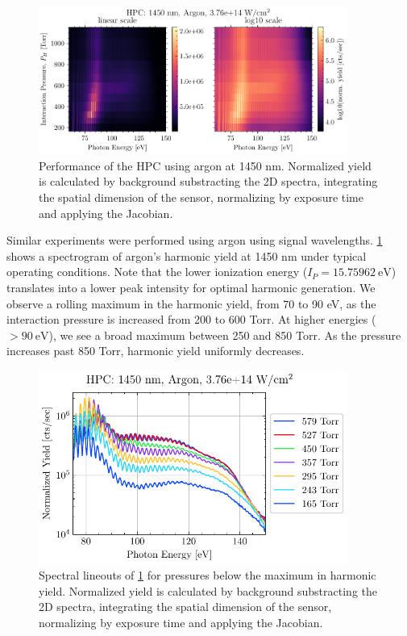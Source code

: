 

\begin{figure}
	\centering
	\includegraphics[width=0.9\textwidth]{figures/chap3/HPC_1450nm_Ar_spectrogram.pdf}
	\caption{Performance of the HPC using argon at 1450 nm. Normalized yield is calculated by background substracting the 2D spectra, integrating the spatial dimension of the sensor, normalizing by exposure time and applying the Jacobian.}
	\label{fig:HPC_1450nm_Ar_spectrogram}
\end{figure}

Similar experiments were performed using argon using signal wavelengths. \cref{fig:HPC_1450nm_Ar_spectrogram} shows a spectrogram of argon's harmonic yield at 1450 nm under typical operating conditions. Note that the lower ionization energy ($I_P = 15.75962 \ \textrm{eV}$) translates into a lower peak intensity for optimal harmonic generation. We observe a rolling maximum in the harmonic yield, from 70 to 90 eV, as the interaction pressure is increased from 200 to 600 Torr. At higher energies ($> 90 \ \textrm{eV}$), we see a broad maximum between 250 and 850 Torr. As the pressure increases past 850 Torr, harmonic yield uniformly decreases.

\begin{figure}
	\centering
	\includegraphics[width=0.9\textwidth]{figures/chap3/HPC_1450nm_Ar_lineouts.pdf}
	\caption{Spectral lineouts of \cref{fig:HPC_1450nm_Ar_spectrogram} for pressures below the maximum in harmonic yield. Normalized yield is calculated by background substracting the 2D spectra, integrating the spatial dimension of the sensor, normalizing by exposure time and applying the Jacobian.}
	\label{fig:HPC_1450nm_Ar_lineouts}
\end{figure}

